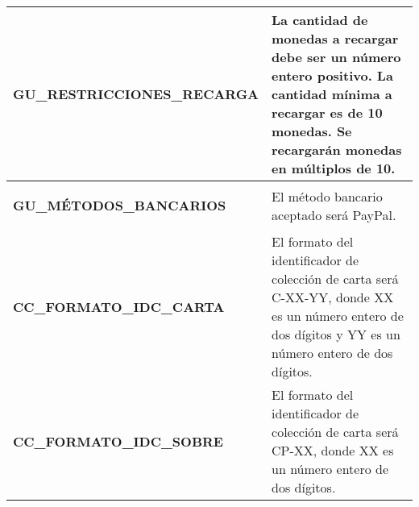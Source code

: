 \begin{table}[htb]
\begin{tabular}{>{\columncolor{lightgreen!20}}p{7cm} p{10cm}}
    \midrule
    \hypertarget{confParam:gu-restriccionesRecarga}{}
    \textbf{GU\_RESTRICCIONES\_RECARGA} & La cantidad de monedas a recargar debe ser un número entero positivo. La cantidad mínima a recargar es de 10 monedas. Se recargarán monedas en múltiplos de 10. \\
    \midrule
    \hypertarget{confParam:metodosBancarios}{}
    \textbf{GU\_MÉTODOS\_BANCARIOS} & El método bancario aceptado será PayPal. \\
    \midrule
    \hypertarget{confParam:cc-formatoIDCCarta}{}
    \textbf{CC\_FORMATO\_IDC\_CARTA} & El formato del identificador de colección de carta será C-XX-YY, donde XX es un número entero de dos dígitos y YY es un número entero de dos dígitos. \\
    \midrule
    \hypertarget{confParam:cc-formatoIDCSobre}{}
    \textbf{CC\_FORMATO\_IDC\_SOBRE} & El formato del identificador de colección de carta será CP-XX, donde XX es un número entero de dos dígitos. \\
    \bottomrule
    \end{tabular}
\end{table}